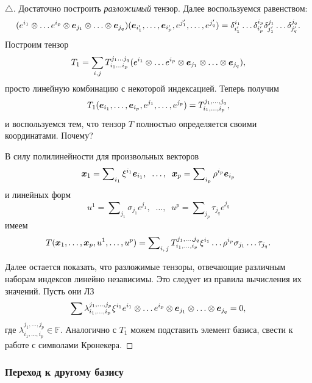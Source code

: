\begin{proof}[$\triangle$]
Достаточно построить \textit{разложимый} тензор. Далее воспользуемся равенством:
$$
    (e^{i_{1}} \otimes \ldots e^{i_p} \otimes \mbox{\boldmath $e$}_{j_{1}} \otimes \ldots \otimes \mbox{\boldmath $e$}_{j_q}) (\mbox{\boldmath $e$}_{i_{1}'},  \ldots,  \mbox{\boldmath $e$}_{i_p'}, e^{j_1'}, \ldots,  e^{j_q'}) =
     \delta_{i_1'}^{i_{1}} \ldots \delta_{i_p'}^{i_{p}}
     \delta_{j_1'}^{j_{1}} \ldots \delta_{j_q'}^{j_{q}}.
$$
Построим тензор
$$
    T_{1} = \sum_{i, j} T_{i_1 \ldots i_p}^{j_1 \ldots  j_q} 
    (e^{i_{1}} \otimes \ldots e^{i_p} \otimes \mbox{\boldmath $e$}_{j_{1}} \otimes \ldots \otimes \mbox{\boldmath $e$}_{j_q}),
$$
просто линейную комбинацию с некоторой индексацией. Теперь получим
\begin{equation*}
    T_1(\mbox{\boldmath $e$}_{i_1}, \dots, \mbox{\boldmath $e$}_{i_p}, e^{j_1}, \dots, e^{j_p}) = T_{i_1, \dots, i_p}^{j_1, \dots, j_q},
\end{equation*}
и воспользуемся тем, что тензор $T$ полностью определяется своими координатами. Почему? 

В силу полилинейности для произвольных векторов
$$
    \mbox{\boldmath $x$}_{1} = \sum\nolimits_{i_{1}} \xi^{i_{1}} \mbox{\boldmath $e$}_{i_{1}}, \; \;
    \ldots, \; \;
    \mbox{\boldmath $x$}_p = \sum\nolimits_{i_p} \rho^{i_p} \mbox{\boldmath $e$}_{i_p}
$$
и линейных форм
$$
    u^1 = \sum\nolimits_{j_{1}} \sigma_{j_{1}} e^{j_{1}}, \; \;
    \ldots, \; \;
    u^p = \sum\nolimits_{j_p} \tau_{j_q} e^{j_q}
$$
имеем
$$
    T(\mbox{\boldmath $x$}_{1}, \ldots,  \mbox{\boldmath $x$}_p, u^1, \ldots,  u^p) = \sum\nolimits_{i, \, j}
    T_{i_1, \dots, i_p}^{j_1, \dots, j_q} \xi^{i_{1}} \ldots \rho^{i_p} \sigma_{j_{1}} \ldots \tau_{j_q}.
$$


Далее остается показать, что разложимые тензоры, отвечающие различным наборам индексов линейно независимы. Это следует из правила вычисления их значений. Пусть они ЛЗ
$$
    \sum \lambda_{i_1, \dots, i_p}^{j_1, \dots, j_p} \xi^{i_{1}} 
    e^{i_{1}} \otimes \ldots e^{i_p} \otimes \mbox{\boldmath $e$}_{j_{1}} \otimes \ldots \otimes \mbox{\boldmath $e$}_{j_q} = 0,
$$
где $\lambda_{i_1, \dots, i_p}^{j_1, \dots, j_p} \in \mathbb{F}$. Аналогично с $T_1$ можем подставить элемент базиса, свести к работе с символами Кронекера. 

\end{proof}


\subsubsection{Переход к другому базису}


